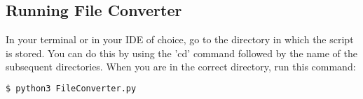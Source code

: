 \documentclass[
	a4paper, %
	12pt, %
]{CSSullivanBusinessReport}
\begin{document}
\begin{fullwidth}
\section{Running File Converter}
In your terminal or in your IDE of choice, go to the directory in which the script is stored. You can do this by using the 'cd' command followed by the name of the subsequent directories. When you are in the correct directory, run this command:

\begin{lstlisting}[language=bash]
	$ python3 FileConverter.py
	\end{lstlisting}
	
\newpage

\end{fullwidth}





\printbibliography
\end{document}
